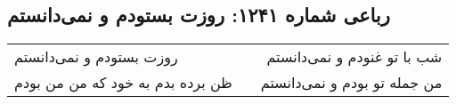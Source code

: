 \begin{center}
\section*{رباعی شماره ۱۲۴۱: روزت بستودم و نمی‌دانستم}
\label{sec:1241}
\begin{longtable}{l p{0.5cm} r}
روزت بستودم و نمی‌دانستم
&&
شب با تو غنودم و نمی‌دانستم
\\
ظن برده بدم به خود که من من بودم
&&
من جمله تو بودم و نمی‌دانستم
\\
\end{longtable}
\end{center}
